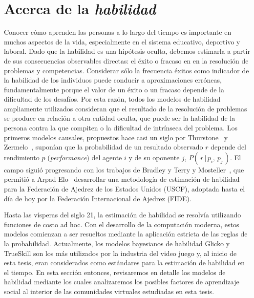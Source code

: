 \documentclass[a4paper,11pt]{book}
\theoremstyle{definition}
\begin{document}
\section{Acerca de la \emph{habilidad}} \label{sec:operacionalizacion_habilidad}

Conocer c\'omo aprenden las personas a lo largo del tiempo es importante en muchos aspectos de la vida, especialmente en el sistema educativo, deportivo y laboral.
%
Dado que la habilidad es una hip\'otesis oculta, debemos estimarla a partir de sus consecuencias observables directas: el \'exito o fracaso en en la resoluci\'on de problemas y competencias.
%
Considerar s\'olo la frecuencia \'exitos como indicador de la habilidad de los individuos puede conducir a aproximaciones err\'oneas, fundamentalmente porque el valor de un \'exito o un fracaso depende de la dificultad de los desaf\'ios.
%
Por esta raz\'on, todos los modelos de habilidad ampliamente utilizados consideran que el resultado de la resoluci\'on de problemas se produce en relaci\'on a otra entidad oculta, que puede ser la habilidad de la persona contra la que compiten o la dificultad de intr\'inseca del problema.
%
Los primeros modelos causales, propuestos hace casi un siglo por Thurstone~\cite{Thurstone1927} y Zermelo~\cite{Zermelo1929}, supon\'ian que la probabilidad de un resultado observado $r$ depende del rendimiento $p$ (\emph{performance}) del agente $i$ y de su oponente $j$, $P(\, r \,|\, p_i, \, p_j \,)$.
%
El campo sigui\'o progresando con los trabajos de Bradley y Terry \cite{Bradley1952} y Mosteller~\cite{Mosteller1951a,Mosteller1951b,Mosteller1951c}, que permiti\'o a Arpad Elo~\cite{Elo2008} desarrollar una metodolog\'ia de estimaci\'on de habilidad para la Federaci\'on de Ajedrez de los Estados Unidos (USCF), adoptada hasta el d\'ia de hoy por la Federaci\'on Internacional de Ajedrez (FIDE).


Hasta las v\'isperas del siglo 21, la estimaci\'on de habilidad se resolv\'ia utilizando funciones de costo ad hoc.
%
Con el desarrollo de la computaci\'on moderna, estos modelos comienzan a ser resueltos mediante la aplicaci\'on estricta de las reglas de la probabilidad.
%
Actualmente, los modelos bayesianos de habilidad Glicko \cite{glickman2001} y TrueSkill \cite{Herbrich2007} son los m\'as utilizados por la industria del video juego y, al inicio de esta tesis, eran considerados como est\'andares para la estimaci\'on de habilidad en el tiempo.
%
En esta secci\'on entonces, revisaremos en detalle los modelos de habilidad mediante los cuales analizaremos los posibles factores de aprendizaje social al interior de las comunidades virtuales estudiadas en esta tesis.
\end{document}
